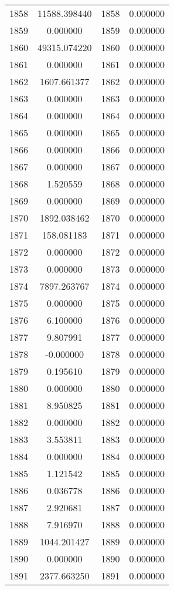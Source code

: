\documentclass[12pt]{article}
\begin{document}
\begin{longtable}{@{}cccc@{}}
1858 & 11588.398440 & 1858 & 0.000000 \\
1859 & 0.000000 & 1859 & 0.000000 \\
1860 & 49315.074220 & 1860 & 0.000000 \\
1861 & 0.000000 & 1861 & 0.000000 \\
1862 & 1607.661377 & 1862 & 0.000000 \\
1863 & 0.000000 & 1863 & 0.000000 \\
1864 & 0.000000 & 1864 & 0.000000 \\
1865 & 0.000000 & 1865 & 0.000000 \\
1866 & 0.000000 & 1866 & 0.000000 \\
1867 & 0.000000 & 1867 & 0.000000 \\
1868 & 1.520559 & 1868 & 0.000000 \\
1869 & 0.000000 & 1869 & 0.000000 \\
1870 & 1892.038462 & 1870 & 0.000000 \\
1871 & 158.081183 & 1871 & 0.000000 \\
1872 & 0.000000 & 1872 & 0.000000 \\
1873 & 0.000000 & 1873 & 0.000000 \\
1874 & 7897.263767 & 1874 & 0.000000 \\
1875 & 0.000000 & 1875 & 0.000000 \\
1876 & 6.100000 & 1876 & 0.000000 \\
1877 & 9.807991 & 1877 & 0.000000 \\
1878 & -0.000000 & 1878 & 0.000000 \\
1879 & 0.195610 & 1879 & 0.000000 \\
1880 & 0.000000 & 1880 & 0.000000 \\
1881 & 8.950825 & 1881 & 0.000000 \\
1882 & 0.000000 & 1882 & 0.000000 \\
1883 & 3.553811 & 1883 & 0.000000 \\
1884 & 0.000000 & 1884 & 0.000000 \\
1885 & 1.121542 & 1885 & 0.000000 \\
1886 & 0.036778 & 1886 & 0.000000 \\
1887 & 2.920681 & 1887 & 0.000000 \\
1888 & 7.916970 & 1888 & 0.000000 \\
1889 & 1044.201427 & 1889 & 0.000000 \\
1890 & 0.000000 & 1890 & 0.000000 \\
1891 & 2377.663250 & 1891 & 0.000000 \\

\end{longtable}
\end{document}
